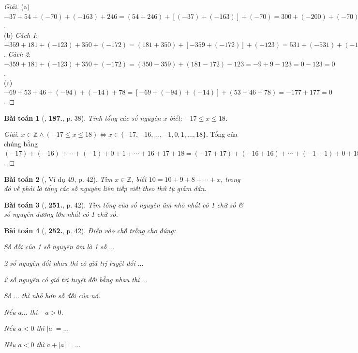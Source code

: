 \documentclass{article}
\numberwithin{equation}{section}
\newtheorem{baitoan}{Bài toán}
\begin{document}
\begin{proof}[Giải]
	(a) $-37 + 54 + (-70) + (-163) + 246 = (54 + 246) + [(-37) + (-163)] + (-70) = 300 + (-200) + (-70) = 100 - 70 = 30$.\\(b) \textit{Cách 1}: $-359 + 181 + (-123) + 350 + (-172) = (181 + 350) + [-359 + (-172)] + (-123) = 531 + (-531) + (-123) = 0 - 123 = -123$. \textit{Cách 2}: $-359 + 181 + (-123) + 350 + (-172) = (350 - 359) + (181 - 172) - 123 = -9 + 9 - 123 = 0 - 123 = 0$.\\(c) $-69 + 53 + 46 + (-94) + (-14) + 78 = [-69 + (-94) + (-14)] + (53 + 46 + 78) = -177 + 177 = 0$.
\end{proof}

\begin{baitoan}[\cite{Tuyen_Toan_6}, \textbf{187.}, p. 38]
	Tính tổng các số nguyên $x$ biết: $-17\le x\le18$.
\end{baitoan}

\begin{proof}[Giải]
	$x\in\mathbb{Z}\land(-17\le x\le18)\Leftrightarrow x\in\{-17,-16,\ldots,-1,0,1,\ldots,18\}$. Tổng của chúng bằng $(-17) + (-16) + \cdots + (-1) + 0 + 1 + \cdots + 16 + 17 + 18 = (-17 + 17) + (-16 + 16) + \cdots + (-1 + 1) + 0 + 18 = 0 + 0 + \cdots + 0 + 0 + 18 = 18$. 
\end{proof}

\begin{baitoan}[\cite{Binh_Toan_6_tap_1}, Ví dụ 49, p. 42]
	Tìm $x\in\mathbb{Z}$, biết $10 = 10 + 9 + 8 + \cdots + x$, trong đó vế phải là tổng các số nguyên liên tiếp viết theo thứ tự giảm dần.
\end{baitoan}

\begin{baitoan}[\cite{Binh_Toan_6_tap_1}, \textbf{251.}, p. 42]
	Tìm tổng của số nguyên âm nhỏ nhất có 1 chữ số \& số nguyên dương lớn nhất có 1 chữ số.
\end{baitoan}

\begin{baitoan}[\cite{Binh_Toan_6_tap_1}, \textbf{252.}, p. 42]
	Điền vào chỗ trống cho đúng:
	\begin{enumerate*}
		\item[(a)] Số đối của 1 số nguyên âm là 1 số $\ldots$
		\item[(b)] 2 số nguyên đối nhau thì có giá trị tuyệt đối $\ldots$
		\item[(c)] 2 số nguyên có giá trị tuyệt đối bằng nhau thì $\ldots$
		\item[(d)] Số $\ldots$ thì nhỏ hơn số đối của nó.
		\item[(e)] Nếu $a\ldots$ thì $-a > 0$.
		\item[(f)] Nếu $a < 0$ thì $|a| = \ldots$
		\item[(g)] Nếu $a < 0$ thì $a + |a| = \ldots$
	\end{enumerate*}
\end{baitoan}
\end{document}
